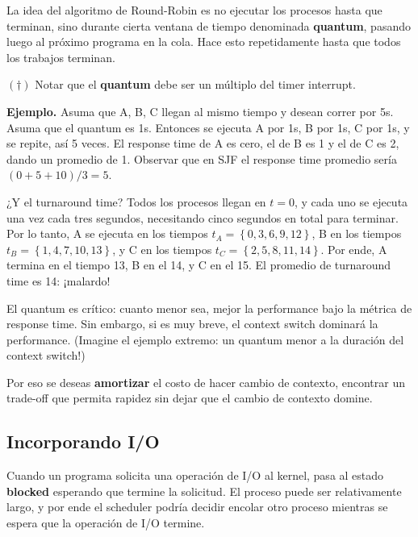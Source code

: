 \documentclass[12pt]{article}
\theoremstyle{definition}
\begin{document}
La idea del algoritmo de Round-Robin es no ejecutar los procesos hasta que
terminan, sino durante cierta ventana de tiempo denominada \textbf{quantum},
pasando luego al próximo programa en la cola. Hace esto repetidamente hasta que
todos los trabajos terminan. 

\begin{shaded}
    $(\dagger)$ Notar que el \textbf{quantum} debe ser un múltiplo del timer
    interrupt.
\end{shaded}

\begin{shaded}
    \textbf{Ejemplo.} Asuma que A, B, C llegan al mismo tiempo y desean correr
    por 5s. Asuma que el quantum es 1s. Entonces se ejecuta A por 1s, B por 1s,
    C por 1s, y se repite, así 5 veces. El response time de A es cero, el de B
    es 1 y el de C es 2, dando un promedio de 1. Observar que en SJF el response
    time promedio sería $(0 + 5 + 10) / 3 = 5$.

    ¿Y el turnaround time? Todos los procesos llegan en $t = 0$, y cada uno se
    ejecuta una vez cada tres segundos, necesitando cinco segundos en total para
    terminar. Por lo
    tanto, A se ejecuta en los tiempos $t_A = \left\{ 0, 3, 6, 9, 12 \right\} $, 
    B en los tiempos $t_B = \left\{ 1, 4, 7, 10, 13 \right\} $, y C en los
    tiempos $t_C = \left\{ 2, 5, 8, 11, 14 \right\} $. Por ende, A termina en el
    tiempo 13, B en el 14, y C en el 15. El promedio de turnaround time es 14:
    ¡malardo!
\end{shaded}

El quantum es crítico: cuanto menor sea, mejor la performance bajo la métrica de
response time. Sin embargo, si es muy breve, el context switch dominará la
performance. (Imagine el ejemplo extremo: un quantum menor a la duración del
context switch!)

Por eso se deseas \textbf{amortizar} el costo de hacer cambio de contexto,
encontrar un trade-off que permita rapidez sin dejar que el cambio de contexto
domine.

\subsection{Incorporando I/O}

Cuando un programa solicita una operación de I/O al kernel, pasa al estado
\textbf{blocked} esperando que termine la solicitud. El proceso puede ser
relativamente largo, y por ende el scheduler podría decidir encolar otro proceso
mientras se espera que la operación de I/O termine.
\end{document}
